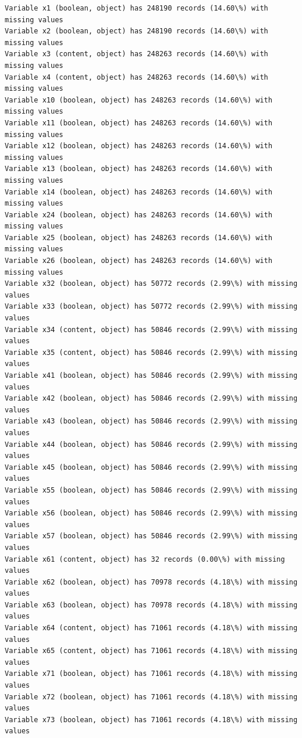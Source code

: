 \documentclass[11pt]{article}
\begin{document}
    \begin{Verbatim}[commandchars=\\\{\}]
Variable x1 (boolean, object) has 248190 records (14.60\%) with missing values
Variable x2 (boolean, object) has 248190 records (14.60\%) with missing values
Variable x3 (content, object) has 248263 records (14.60\%) with missing values
Variable x4 (content, object) has 248263 records (14.60\%) with missing values
Variable x10 (boolean, object) has 248263 records (14.60\%) with missing values
Variable x11 (boolean, object) has 248263 records (14.60\%) with missing values
Variable x12 (boolean, object) has 248263 records (14.60\%) with missing values
Variable x13 (boolean, object) has 248263 records (14.60\%) with missing values
Variable x14 (boolean, object) has 248263 records (14.60\%) with missing values
Variable x24 (boolean, object) has 248263 records (14.60\%) with missing values
Variable x25 (boolean, object) has 248263 records (14.60\%) with missing values
Variable x26 (boolean, object) has 248263 records (14.60\%) with missing values
Variable x32 (boolean, object) has 50772 records (2.99\%) with missing values
Variable x33 (boolean, object) has 50772 records (2.99\%) with missing values
Variable x34 (content, object) has 50846 records (2.99\%) with missing values
Variable x35 (content, object) has 50846 records (2.99\%) with missing values
Variable x41 (boolean, object) has 50846 records (2.99\%) with missing values
Variable x42 (boolean, object) has 50846 records (2.99\%) with missing values
Variable x43 (boolean, object) has 50846 records (2.99\%) with missing values
Variable x44 (boolean, object) has 50846 records (2.99\%) with missing values
Variable x45 (boolean, object) has 50846 records (2.99\%) with missing values
Variable x55 (boolean, object) has 50846 records (2.99\%) with missing values
Variable x56 (boolean, object) has 50846 records (2.99\%) with missing values
Variable x57 (boolean, object) has 50846 records (2.99\%) with missing values
Variable x61 (content, object) has 32 records (0.00\%) with missing values
Variable x62 (boolean, object) has 70978 records (4.18\%) with missing values
Variable x63 (boolean, object) has 70978 records (4.18\%) with missing values
Variable x64 (content, object) has 71061 records (4.18\%) with missing values
Variable x65 (content, object) has 71061 records (4.18\%) with missing values
Variable x71 (boolean, object) has 71061 records (4.18\%) with missing values
Variable x72 (boolean, object) has 71061 records (4.18\%) with missing values
Variable x73 (boolean, object) has 71061 records (4.18\%) with missing values

\end{Verbatim}
\end{document}
